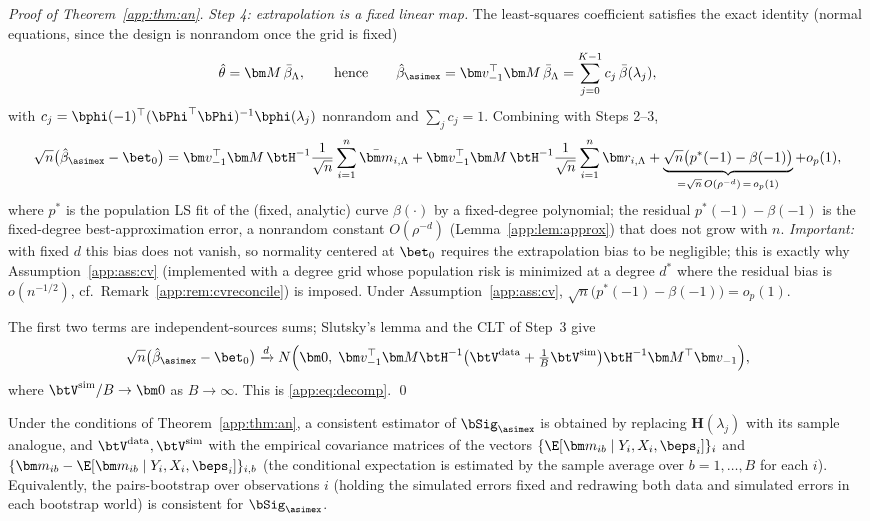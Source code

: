 \begin{proof}[Proof of Theorem~\ref{app:thm:an}]
\emph{Step 4: extrapolation is a fixed linear map.} The least-squares
coefficient satisfies the exact identity (normal equations, since the
design is nonrandom once the grid is fixed)
\[
  \hat\theta=\bm M\,\bar\beta_\Lambda,
  \qquad\text{hence}\qquad
  \hat\beta_{\asimex}
  =\bm v_{-1}^\top\bm M\,\bar\beta_\Lambda
  =\sum_{j=0}^{K-1}c_j\,\bar\beta(\lambda_j),
\]
with $c_j=\bphi(-1)^\top(\bPhi^\top\bPhi)^{-1}\bphi(\lambda_j)$
nonrandom and $\sum_jc_j=1$. Combining with Steps 2--3,
\[
  \sqrt n\bigl(\hat\beta_{\asimex}-\bet_0\bigr)
  =\bm v_{-1}^\top\bm M\,\btH^{-1}
   \frac{1}{\sqrt n}\sum_{i=1}^n\bar{\bm m}_{i,\Lambda}
  +\bm v_{-1}^\top\bm M\,\btH^{-1}
   \frac{1}{\sqrt n}\sum_{i=1}^n\bm r_{i,\Lambda}
  +\underbrace{\sqrt n\bigl(p^*(-1)-\beta(-1)\bigr)}
   _{=\sqrt n\,O(\rho^{-d})\,=\,o_p(1)}
  +o_p(1),
\]
where $p^*$ is the population LS fit of the (fixed, analytic) curve
$\beta(\cdot)$ by a fixed-degree polynomial; the residual
$p^*(-1)-\beta(-1)$ is the fixed-degree best-approximation error, a
nonrandom constant $O(\rho^{-d})$ (Lemma~\ref{app:lem:approx}) that does not
grow with $n$. \emph{Important:} with fixed $d$ this bias does not
vanish, so normality centered at $\bet_0$ requires the extrapolation
bias to be negligible; this is exactly why Assumption~\ref{app:ass:cv}
(implemented with a degree grid whose population risk is minimized at a
degree $d^*$ where the residual bias is $o(n^{-1/2})$, cf.\
Remark~\ref{app:rem:cvreconcile}) is imposed. Under Assumption~\ref{app:ass:cv},
$\sqrt n\bigl(p^*(-1)-\beta(-1)\bigr)=o_p(1)$.

The first two terms are independent-sources sums; Slutsky's lemma and the
CLT of Step~3 give
\[
  \sqrt n\bigl(\hat\beta_{\asimex}-\bet_0\bigr)
  \xrightarrow{d} N\Bigl(\bm 0,\;
  \bm v_{-1}^\top\bm M\btH^{-1}
  \bigl(\btV^{\mathrm{data}}+\tfrac1B\btV^{\mathrm{sim}}\bigr)
  \btH^{-1}\bm M^\top\bm v_{-1}\Bigr),
\]
where $\btV^{\mathrm{sim}}/B\to\bm 0$ as $B\to\infty$. This is
\eqref{app:eq:decomp}. \qed
\end{proof}

\begin{corollary}\label{app:cor:var}
Under the conditions of Theorem~\ref{app:thm:an}, a consistent estimator of
$\bSig_{\asimex}$ is obtained by replacing
$\bm H(\lambda_j)$ with its sample analogue, and
$\btV^{\mathrm{data}},\btV^{\mathrm{sim}}$ with the empirical covariance
matrices of the vectors
$\{\E[\bm m_{ib}\mid Y_i,X_i,\beps_i]\}_i$ and
$\{\bm m_{ib}-\E[\bm m_{ib}\mid Y_i,X_i,\beps_i]\}_{i,b}$
(the conditional expectation is estimated by the sample average over
$b=1,\dots,B$ for each $i$). Equivalently, the pairs-bootstrap over
observations $i$ (holding the simulated errors fixed and redrawing both
data and simulated errors in each bootstrap world) is consistent for
$\bSig_{\asimex}$.
\end{corollary}

